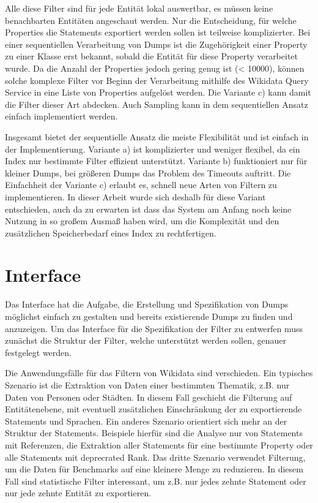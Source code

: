 Alle diese Filter sind für jede Entität lokal auswertbar, es müssen keine benachbarten Entitäten angeschaut werden.
Nur die Entscheidung, für welche Properties die Statements exportiert werden sollen ist teilweise komplizierter.
Bei einer sequentiellen Verarbeitung von Dumps ist die Zugehörigkeit einer Property zu einer Klasse erst bekannt, sobald die Entität für diese Property verarbeitet wurde.
Da die Anzahl der Properties jedoch gering genug ist (< 10000), können solche komplexe Filter vor Beginn der Verarbeitung mithilfe des Wikidata Query Service in eine Liste von Properties aufgelöst werden.
Die Variante c) kann damit die Filter dieser Art abdecken.
Auch Sampling kann in dem sequentiellen Ansatz einfach implementiert werden.

Insgesamt bietet der sequentielle Ansatz die meiste Flexibilität und ist einfach in der Implementierung.
Variante a) ist komplizierter und weniger flexibel, da ein Index nur bestimmte Filter effizient unterstützt.
Variante b) funktioniert nur für kleiner Dumps, bei größeren Dumps das Problem des Timeouts auftritt.
Die Einfachheit der Variante c) erlaubt es, schnell neue Arten von Filtern zu implementieren.
In dieser Arbeit wurde sich deshalb für diese Variant entschieden, auch da zu erwarten ist dass das System am Anfang noch keine Nutzung in so großem Ausmaß haben wird, um die Komplexität und den zusätzlichen Speicherbedarf eines Index zu rechtfertigen.

\section{Interface}
Das Interface hat die Aufgabe, die Erstellung und Spezifikation von Dumps möglichst einfach zu gestalten und bereits existierende Dumps zu finden und anzuzeigen.
Um das Interface für die Spezifikation der Filter zu entwerfen muss zunächst die Struktur der Filter, welche unterstützt werden sollen, genauer festgelegt werden.

Die Anwendungsfälle für das Filtern von Wikidata sind verschieden.
Ein typisches Szenario ist die Extraktion von Daten einer bestimmten Thematik, z.B. nur Daten von Personen oder Städten.
In diesem Fall geschieht die Filterung auf Entitätenebene, mit eventuell zusätzlichen Einschränkung der zu exportierende Statements und Sprachen.
Ein anderes Szenario orientiert sich mehr an der Struktur der Statements.
Beispiele hierfür sind die Analyse nur von Statements mit Referenzen, die Extraktion aller Statements für eine bestimmte Property oder alle Statements mit deprecrated Rank.
Das dritte Szenario verwendet Filterung, um die Daten für Benchmarks auf eine kleinere Menge zu reduzieren.
In diesem Fall sind statistische Filter interessant, um z.B. nur jedes zehnte Statement oder nur jede zehnte Entität zu exportieren.

